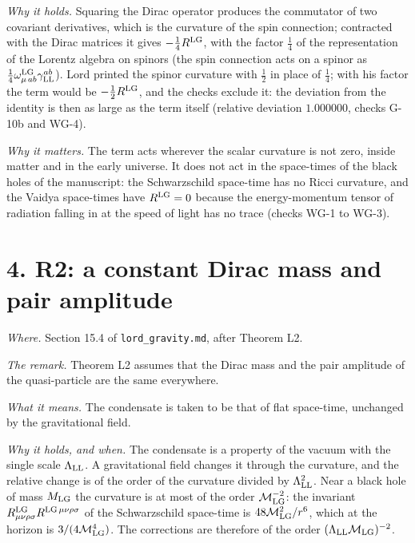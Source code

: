 \documentclass[
  10pt,
]{article}
\begin{document}
\emph{Why it holds.} Squaring the Dirac operator produces the commutator
of two covariant derivatives, which is the curvature of the spin
connection; contracted with the Dirac matrices it gives
\(-\tfrac14R^{\rm LG}\), with the factor \(\tfrac14\) of the
representation of the Lorentz algebra on spinors (the spin connection
acts on a spinor as
\(\tfrac14\omega^{\rm LG}_{\mu\,ab}\gamma^{ab}_{\rm LL}\)). Lord printed
the spinor curvature with \(\tfrac12\) in place of \(\tfrac14\); with
his factor the term would be \(-\tfrac12R^{\rm LG}\), and the checks
exclude it: the deviation from the identity is then as large as the term
itself (relative deviation \(1.000000\), checks G-10b and WG-4).

\emph{Why it matters.} The term acts wherever the scalar curvature is
not zero, inside matter and in the early universe. It does not act in
the space-times of the black holes of the manuscript: the Schwarzschild
space-time has no Ricci curvature, and the Vaidya space-times have
\(R^{\rm LG}=0\) because the energy-momentum tensor of radiation falling
in at the speed of light has no trace (checks WG-1 to WG-3).

\hypertarget{r2-a-constant-dirac-mass-and-pair-amplitude}{%
\section{4. R2: a constant Dirac mass and pair
amplitude}\label{r2-a-constant-dirac-mass-and-pair-amplitude}}

\emph{Where.} Section 15.4 of \texttt{lord\_gravity.md}, after Theorem
L2.

\emph{The remark.} Theorem L2 assumes that the Dirac mass and the pair
amplitude of the quasi-particle are the same everywhere.

\emph{What it means.} The condensate is taken to be that of flat
space-time, unchanged by the gravitational field.

\emph{Why it holds, and when.} The condensate is a property of the
vacuum with the single scale \(\Lambda_{\rm LL}\). A gravitational field
changes it through the curvature, and the relative change is of the
order of the curvature divided by \(\Lambda_{\rm LL}^2\). Near a black
hole of mass \(M_{\rm LG}\) the curvature is at most of the order
\(\mathcal M_{\rm LG}^{-2}\): the invariant
\(R^{\rm LG}_{\mu\nu\rho\sigma}R^{{\rm LG}\,\mu\nu\rho\sigma}\) of the
Schwarzschild space-time is \(48\mathcal M_{\rm LG}^2/r^6\), which at
the horizon is \(3/(4\mathcal M_{\rm LG}^4)\). The corrections are
therefore of the order \((\Lambda_{\rm LL}\mathcal M_{\rm LG})^{-2}\).
\end{document}
